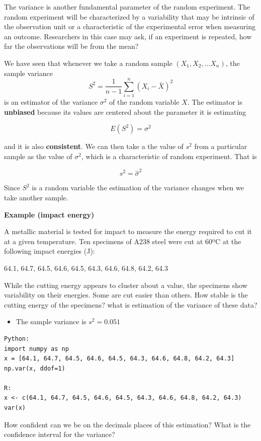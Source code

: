 \documentclass[
]{book}
\providecommand{\tightlist}{%
  \setlength{\itemsep}{0pt}\setlength{\parskip}{0pt}}
\begin{document}
The variance is another fundamental parameter of the random experiment. The random experiment will be characterized by a variability that may be intrinsic of the observation unit or a characteristic of the experimental error when measuring an outcome. Researchers in this case may ask, if an experiment is repeated, how far the observations will be from the mean?

We have seen that whenever we take a random sample \((X_1, X_2, ... X_n)\), the sample variance
\[S^2=\frac{1}{n-1}\sum_{i=1}^n (X_i-\bar{X})^2\]
is an estimator of the variance \(\sigma^2\) of the random variable \(X\). The estimator is \textbf{unbiased} because its values are centered about the parameter it is estimating

\[E(S^2)=\sigma^2\]

and it is also \textbf{consistent}. We can then take a the value of \(s^2\) from a particular sample as the value of \(\sigma^2\), which is a characteristic of random experiment. That is

\[s^2=\hat{\sigma}^2\]

Since \(S^2\) is a random variable the estimation of the variance changes when we take another sample.

\textbf{Example (impact energy)}

A metallic material is tested for impact to measure the energy required to cut it at a given temperature. Ten specimens of A238 steel were cut at 60ºC at the following impact energies (J):

64.1, 64.7, 64.5, 64.6, 64.5, 64.3, 64.6, 64.8, 64.2, 64.3

While the cutting energy appears to cluster about a value, the specimens show variability on their energies. Some are cut easier than others. How stable is the cutting energy of the specimens? what is estimation of the variance of these data?

\begin{itemize}
\tightlist
\item
  The sample variance is \(s^2=0.051\)
\end{itemize}

\begin{verbatim}
Python:
import numpy as np
x = [64.1, 64.7, 64.5, 64.6, 64.5, 64.3, 64.6, 64.8, 64.2, 64.3]
np.var(x, ddof=1)

R: 
x <- c(64.1, 64.7, 64.5, 64.6, 64.5, 64.3, 64.6, 64.8, 64.2, 64.3)
var(x)
\end{verbatim}

How confident can we be on the decimals places of this estimation? What is the confidence interval for the variance?
\end{document}
